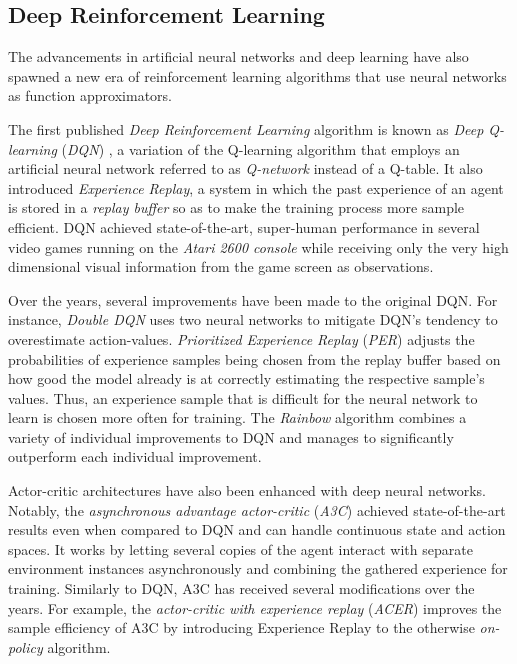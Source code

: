 \subsection{Deep Reinforcement Learning}
The advancements in artificial neural networks and deep learning have also spawned a new era of reinforcement learning algorithms that use neural networks as function approximators.

The first published \textit{Deep Reinforcement Learning} algorithm is known as \textit{Deep Q-learning} (\textit{DQN}) \cite{dqn}, a variation of the Q-learning algorithm that employs an artificial neural network referred to as \textit{Q-network} instead of a Q-table. It also introduced \textit{Experience Replay}, a system in which the past experience of an agent is stored in a \textit{replay buffer} so as to make the training process more sample efficient. DQN achieved state-of-the-art, super-human performance in several video games running on the \textit{Atari 2600 console} while receiving only the very high dimensional visual information from the game screen as observations.

Over the years, several improvements have been made to the original DQN. For instance, \textit{Double DQN} \cite{double-dqn} uses two neural networks to mitigate DQN's tendency to overestimate action-values. \textit{Prioritized Experience Replay} (\textit{PER}) \cite{per} adjusts the probabilities of experience samples being chosen from the replay buffer based on how good the model already is at correctly estimating the respective sample's values. Thus, an experience sample that is difficult for the neural network to learn is chosen more often for training. The \textit{Rainbow} algorithm \cite{rainbow} combines a variety of individual improvements to DQN and manages to significantly outperform each individual improvement.

Actor-critic architectures have also been enhanced with deep neural networks. Notably, the \textit{asynchronous advantage actor-critic} (\textit{A3C}) \cite{a3c} achieved state-of-the-art results even when compared to DQN and can handle continuous state and action spaces. It works by letting several copies of the agent interact with separate environment instances asynchronously and combining the gathered experience for training. Similarly to DQN, A3C has received several modifications over the years. For example, the \textit{actor-critic with experience replay} (\textit{ACER}) \cite{acer} improves the sample efficiency of A3C by introducing Experience Replay to the otherwise \textit{on-policy} \cite{bible} algorithm.

